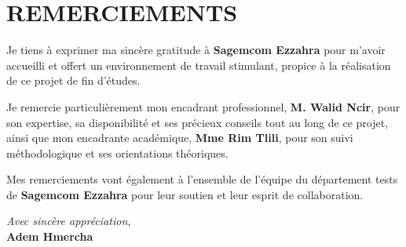 \chapter*{REMERCIEMENTS}
\thispagestyle{fancy}

\vspace{0.5cm}

Je tiens à exprimer ma sincère gratitude à \textbf{Sagemcom Ezzahra}
pour m'avoir accueilli et offert un environnement de travail stimulant,
propice à la réalisation de ce projet de fin d'études.

\vspace{0.4cm}

Je remercie particulièrement mon encadrant professionnel,
\textbf{M. Walid Ncir}, pour son expertise, sa disponibilité et ses
précieux conseils tout au long de ce projet, ainsi que mon encadrante
académique, \textbf{Mme Rim Tlili}, pour son suivi méthodologique et
ses orientations théoriques.

\vspace{0.4cm}

Mes remerciements vont également à l'ensemble de l'équipe du département
tests de \textbf{Sagemcom Ezzahra} pour leur soutien et leur esprit de
collaboration.

\vspace{1.2cm}

\begin{flushright}
  \textit{Avec sincère appréciation,}\\[0.3cm]
  \textbf{Adem Hmercha}
\end{flushright}
